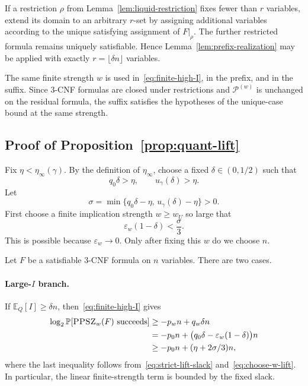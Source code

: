 \documentclass[11pt]{article}
\newcommand{\PPSZ}{\textnormal{\textsc{PPSZ}}}
\newcommand{\Pw}{\mathcal P^{(w)}}
\newcommand{\eps}{\varepsilon}
\newcommand{\E}{\mathbb E}
\newcommand{\Prb}{\mathbb P}
\begin{document}
If a restriction $\rho$ from Lemma~\ref{lem:liquid-restriction} fixes fewer than $r$ variables, extend its domain to an arbitrary $r$-set by assigning additional variables according to the unique satisfying assignment of $F|_\rho$.  The further restricted formula remains uniquely satisfiable.  Hence Lemma~\ref{lem:prefix-realization} may be applied with exactly $r=\lfloor\delta n\rfloor$ variables.

The same finite strength $w$ is used in~\eqref{eq:finite-high-I}, in the prefix, and in the suffix.  Since 3-CNF formulas are closed under restrictions and $\Pw$ is unchanged on the residual formula, the suffix satisfies the hypotheses of the unique-case bound at the same strength.

\subsection{Proof of Proposition~\ref{prop:quant-lift}}

Fix $\eta<\eta_\infty(\gamma)$.  By the definition of $\eta_\infty$, choose a fixed $\delta\in(0,1/2)$ such that
\begin{equation}\label{eq:strict-lift-slack}
 q_0\delta>\eta,
 \qquad
 u_\gamma(\delta)>\eta.
\end{equation}
Let
\[
 \sigma=
 \min\{q_0\delta-\eta,\,u_\gamma(\delta)-\eta\}>0.
\]
First choose a finite implication strength $w\ge w_U$ so large that
\begin{equation}\label{eq:choose-w-lift}
 \eps_w(1-\delta)<\frac{\sigma}{3}.
\end{equation}
This is possible because $\eps_w\to0$.  Only after fixing this $w$ do we choose $n$.

Let $F$ be a satisfiable 3-CNF formula on $n$ variables.  There are two cases.

\paragraph{Large-$I$ branch.}
If $\E_Q[I]\ge\delta n$, then~\eqref{eq:finite-high-I} gives
\begin{align*}
 \log_2\Prb[\PPSZ_w(F)\text{ succeeds}]
 &\ge -p_wn+q_w\delta n\\
 &=-p_0n+
 \bigl(q_0\delta-\eps_w(1-\delta)\bigr)n\\
 &\ge -p_0n+(\eta+2\sigma/3)n,
\end{align*}
where the last inequality follows from~\eqref{eq:strict-lift-slack} and~\eqref{eq:choose-w-lift}.  In particular, the linear finite-strength term is bounded by the fixed slack.
\end{document}
